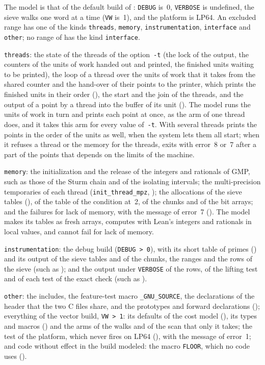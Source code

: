 The model is that of the default build of \jpoints{}: \verb|DEBUG| is~0, \verb|VERBOSE| is
undefined, the sieve walks one word at a time (\verb|VW| is~1), and the platform is LP64. An
excluded range has one of the kinds \verb|threads|, \verb|memory|, \verb|instrumentation|,
\verb|interface| and \verb|other|; no range of \jpoints{} has the kind \verb|interface|.

\verb|threads|: the state of the threads of the option~\verb|-t| (the lock of the output, the
counters of the units of work handed out and printed, the finished units waiting to be printed), the
loop of a thread over the units of work that it takes from the shared counter and the hand-over of
their points to the printer, which prints the finished units in their order
(), the start and the join of the threads, and the output of a point
by a thread into the buffer of its unit (). The model runs the units
of work in turn and prints each point at once, as the arm of one thread does, and it takes this arm
for every value of~\verb|-t|. With several threads \jpoints{} prints the points in the order of the
units as well, when the system lets them all start; when it refuses a thread or the memory for the
threads, \jpoints{} exits with error~8 or~7 after a part of the points that depends on the limits of
the machine.

\verb|memory|: the initialization and the release of the integers and rationals of GMP, such as
those of the Sturm chain and of the isolating intervals; the multi-precision temporaries of each
thread (\verb|init_thread_mpz|, ); the allocations of the sieve tables
(), of the table of the condition at~2, of the chunks and of the bit
arrays; and the failures for lack of memory, with the message of error~7
(). The model makes its tables as fresh arrays, computes with Lean's
integers and rationals in local values, and cannot fail for lack of memory.

\verb|instrumentation|: the debug build (\verb|DEBUG > 0|), with its short table of primes
() and its output of the sieve tables and of the chunks, the ranges and
the rows of the sieve (such as ); and the output under \verb|VERBOSE|
of the rows, of the lifting test and of each test of the exact check (such as
).

\verb|other|: the includes, the feature-test macro \verb|_GNU_SOURCE|, the declarations of the
header that the two C files share, and the prototypes and forward declarations
(); everything of the vector build, \verb|VW > 1|: its defaults of the
cost model (), its types and macros () and
the arms of the walks and of the scan that only it takes; the test of the platform, which never
fires on LP64 (), with the message of error~1; and code without effect
in the build modeled: the macro \verb|FLOOR|, which no code uses ().

